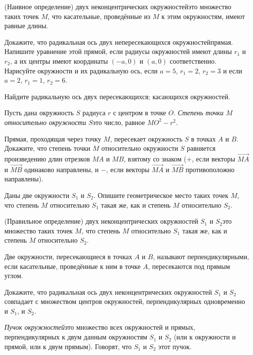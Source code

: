 \documentclass[a4paper,12pt]{article}
\begin{document}

(Наивное определение)  двух неконцентрических окружностей\т это множество таких точек $M$, что касательные, проведённые из $M$ к этим окружностям, имеют равные длины.

Докажите, что радикальная ось двух непересекающихся окружностей\т прямая. Напишите уравнение этой прямой, если радиусы окружностей имеют длины $r_1$ и $r_2$, а их центры имеют координаты $(-a,0)$ и $(a,0)$ соответственно.
Нарисуйте окружности и их радикальную ось, если $a=5$, $r_1=2$, $r_2=3$ и если $a=2$, $r_1=1$, $r_2=6$.

Найдите радикальную ось двух
 пересекающихся;
 касающихся окружностей.

Пусть дана окружность $S$ радиуса $r$ с центром в точке $O$. \emph{Степень точки $M$ относительно окружности $S$}\т это число, равное $MO^2-r^2$.

Прямая, проходящая через точку $M$, пересекает окружность $S$ в точках $A$ и $B$. Докажите, что степень точки $M$ относительно окружности $S$ равняется произведению длин отрезков $MA$ и $MB$, взятому со знаком ($+$, если векторы $\overrightarrow{MA}$ и $\overrightarrow{MB}$ одинаково направлены, и $-$, если векторы $\overrightarrow{MA}$ и $\overrightarrow{MB}$ противоположно направлены).

Даны две окружности $S_1$ и $S_2$. Опишите геометрическое место таких точек $M$, что степень $M$ относительно $S_1$ такая же, как и степень $M$ относительно $S_2$.

(Правильное определение)  двух неконцентрических окружностей $S_1$ и $S_2$\т это множество таких точек $M$, 
что степень $M$ относительно $S_1$ такая же, как и степень $M$ относительно $S_2$.


Две окружности, пересекающиеся в точках $A$ и $B$, называют  перпендикулярными, если касательные, проведённые к ним в точке $A$, пересекаются под прямым углом.

Докажите, что радикальная ось двух неконцентрических окружностей $S_1$ и $S_2$ совпадает с множеством центров окружностей, перпендикулярных одновременно и $S_1$, и $S_2$.


\emph{Пучок окружностей}\т это множество всех окружностей и прямых, перпендикулярных к двум данным окружностям $S_1$ и $S_2$ (или к окружности и прямой, или к двум прямым). Говорят, что $S_1$ и $S_2$  этот пучок.
\end{document}

